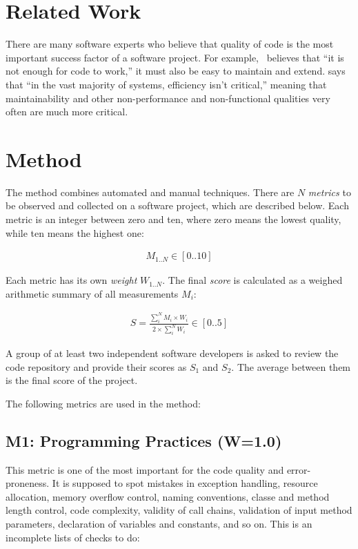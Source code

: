 \documentclass[12pt,oneside]{article}
\begin{document}
\section{Related Work}
\label{sec:related}

There are many software experts who believe that quality of code is the
most important success factor of a software project.
For example,~\citet{martin2009clean} believes that ``it is not enough for code to work,''
it must also be easy to maintain and extend.
\citet{mcconnell2004code} says that ``in the vast majority of systems, efficiency isn't critical,''
meaning that maintainability and other non-performance and non-functional
qualities very often are much more critical.

\section{Method}
\label{sec:method}

The method combines automated and manual techniques. There are $N$
\emph{metrics} to be observed and collected on a software project, which are described
below. Each metric is an integer between zero and ten, where
zero means the lowest quality, while ten means the highest one:

\begin{eqnarray}
M_{1..N} \in [ 0 .. 10 ]
\end{eqnarray}

Each metric has its own \emph{weight} $W_{1..N}$.
The final \emph{score} is calculated
as a weighed arithmetic summary of all measurements $M_i$:

\begin{align}
S = \frac{\sum_i^N M_i \times W_i}{2 \times \sum_i^N W_i} \in [0..5]
\end{align}

A group of at least two independent software developers is asked to review the code
repository and provide their scores as $S_1$ and $S_2$. The average between
them is the final score of the project.

The following metrics are used in the method:

\subsection{M1: Programming Practices (W=1.0)}

This metric is one of the most important for the code quality and error-proneness.
It is supposed to spot mistakes in exception handling, resource allocation, memory overflow control,
naming conventions, classe and method length control, code complexity,
validity of call chains, validation of input method parameters,
declaration of variables and constants,
and so on. This is an incomplete lists of checks to do:
\end{document}
